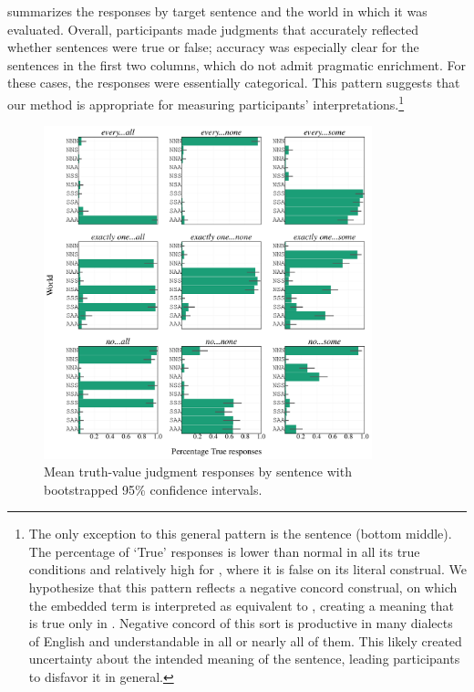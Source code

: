 \documentclass[leqno,12pt]{article}
\begin{document}
 summarizes the responses by target
sentence and the world in which it was evaluated. Overall,
participants made judgments that accurately reflected whether
sentences were true or false; accuracy was especially clear for the
sentences in the first two columns, which do not admit pragmatic
enrichment. For these cases, the responses were essentially
categorical. This pattern suggests that our method is appropriate for
measuring participants' interpretations.\footnote{The only exception
  to this general pattern is the sentence  (bottom middle). The percentage of `True' responses is
  lower than normal in all its true conditions and relatively high for
  , where it is false on its literal construal. We
  hypothesize that this pattern reflects a negative concord construal,
  on which the embedded term is interpreted as equivalent to , creating a meaning that is true only in
  . Negative concord of this sort is productive in many
  dialects of English and understandable in all or nearly all of
  them. This likely created uncertainty about the intended meaning of
  the sentence, leading participants to disfavor it in general.}

\begin{figure}[!t]
  \centering
  \includegraphics[width=0.85\textwidth]{fig/embeddedscalars-experiment-results-binary}
  \caption{Mean truth-value judgment responses by sentence with bootstrapped 95\% confidence intervals.}
  \label{fig:binary:results}
\end{figure}
\end{document}
